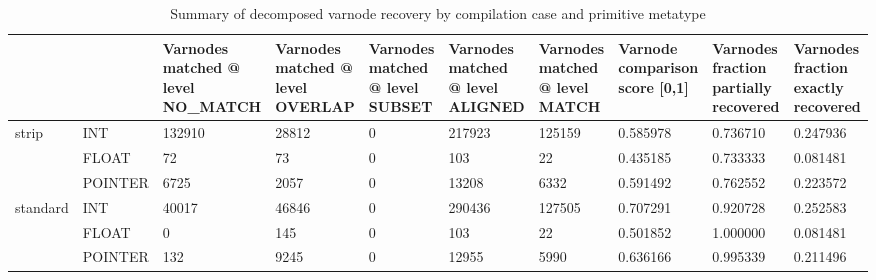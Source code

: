 \begin{table}[t]
\centering
\caption{Summary of decomposed varnode recovery by compilation case and primitive metatype}
\label{table:opts-varnodes-summary-metatypes-decomposed}
\begin{tabular}{lp{2.0cm}p{2.0cm}p{2.0cm}p{2.0cm}p{2.0cm}p{2.0cm}p{2.0cm}p{2.0cm}p{2.0cm}}
\toprule
      &         &  Varnodes matched @ level NO\_MATCH &  Varnodes matched @ level OVERLAP &  Varnodes matched @ level SUBSET &  Varnodes matched @ level ALIGNED &  Varnodes matched @ level MATCH &  Varnode comparison score [0,1] &  Varnodes fraction partially recovered &  Varnodes fraction exactly recovered \\
\midrule
\multirow{3}{*}{strip} & INT &                             132910 &                             28812 &                                0 &                            217923 &                          125159 &                        0.585978 &                               0.736710 &                             0.247936 \\
      & FLOAT &                                 72 &                                73 &                                0 &                               103 &                              22 &                        0.435185 &                               0.733333 &                             0.081481 \\
      & POINTER &                               6725 &                              2057 &                                0 &                             13208 &                            6332 &                        0.591492 &                               0.762552 &                             0.223572 \\
\cline{1-10}
\multirow{3}{*}{standard} & INT &                              40017 &                             46846 &                                0 &                            290436 &                          127505 &                        0.707291 &                               0.920728 &                             0.252583 \\
      & FLOAT &                                  0 &                               145 &                                0 &                               103 &                              22 &                        0.501852 &                               1.000000 &                             0.081481 \\
      & POINTER &                                132 &                              9245 &                                0 &                             12955 &                            5990 &                        0.636166 &                               0.995339 &                             0.211496 \\

\end{tabular}
\end{table}
